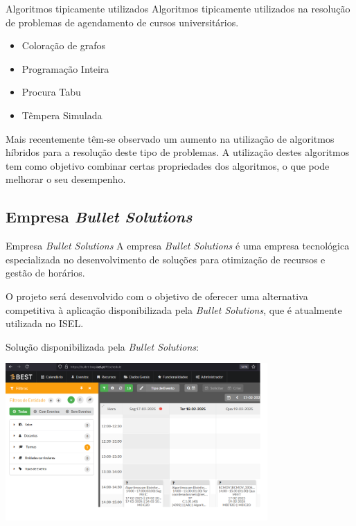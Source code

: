 \documentclass[11]{beamer}
\begin{document}
    \begin{frame}{Algoritmos tipicamente utilizados}
        \justifying
        Algoritmos tipicamente utilizados na resolução de problemas de agendamento de cursos universitários. 
        \begin{itemize}
            \item Coloração de grafos
            \item Programação Inteira
            \item Procura Tabu
            \item Têmpera Simulada
        \end{itemize}

        Mais recentemente têm-se observado um aumento na utilização de algoritmos híbridos para a resolução deste tipo de problemas. A utilização destes algoritmos tem como objetivo combinar certas propriedades dos algoritmos, o que pode melhorar o seu desempenho.
    \end{frame}

    \subsection{Empresa \textit{Bullet Solutions}}

    \begin{frame}{Empresa \textit{Bullet Solutions}}
        \justifying
        A empresa \textit{Bullet Solutions} é uma empresa tecnológica especializada no desenvolvimento de soluções para otimização de recursos e gestão de horários.

        O projeto será desenvolvido com o objetivo de oferecer uma alternativa competitiva à aplicação disponibilizada pela \textit{Bullet Solutions}, que é atualmente utilizada no ISEL.
    \end{frame}

    \begin{frame}
        \justifying
        Solução disponibilizada pela \textit{Bullet Solutions}:
        \begin{center}
            \includegraphics[width=10cm]{img/exemplo-bullet-solutions-software.png}
        \end{center}
    \end{frame}
\end{document}
